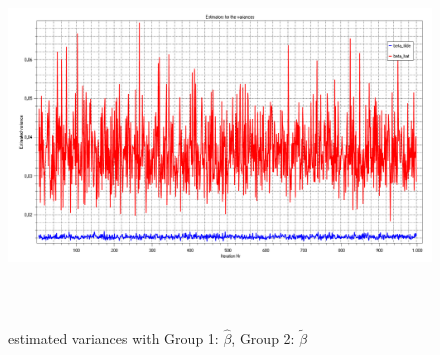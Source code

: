 \documentclass[11pt]{article}
\theoremstyle{break}
\begin{document}
\begin{figure}[H]
\centering
\includegraphics[height=100mm]{variance_estimators.pdf}
\caption[caption]{estimated variances with Group 1: $\hat{\beta}$, Group 2: $\tilde{\beta}$}
\end{figure}
\end{document}
